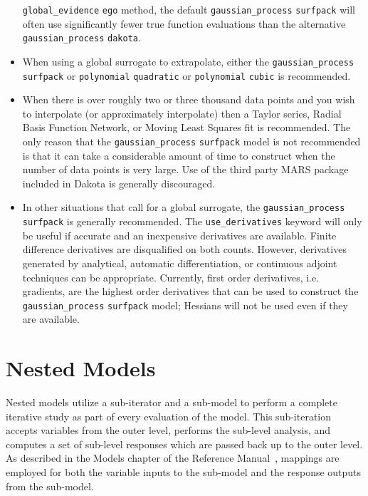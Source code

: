 \begin{itemize}
      \texttt{global\_evidence} \texttt{ego} method, the default
      \texttt{gaussian\_process} \texttt{surfpack} will often use
      significantly fewer true function evaluations than the 
      alternative \texttt{gaussian\_process} \texttt{dakota}.
\item When using a global surrogate to extrapolate, either the
      \texttt{gaussian\_process} \texttt{surfpack} or 
      \texttt{polynomial} \texttt{quadratic} or 
      \texttt{polynomial} \texttt{cubic} is recommended.
\item When there is over roughly two or three thousand data points 
      and you wish to interpolate (or approximately interpolate) then 
      a Taylor series, Radial Basis Function Network, or Moving Least
      Squares fit is recommended.  The only reason that the 
      \texttt{gaussian\_process} \texttt{surfpack} model is not 
      recommended is that it can take a considerable amount of time
      to construct when the number of data points is very large.  Use 
      of the third party MARS package included in Dakota is generally 
      discouraged.
\item In other situations that call for a global surrogate, the 
      \texttt{gaussian\_process} \texttt{surfpack} is generally 
      recommended.  The \texttt{use\_derivatives} keyword will 
      only be useful if accurate and an inexpensive derivatives 
      are available. Finite difference derivatives are disqualified 
      on both counts.  However, derivatives generated by analytical,
      automatic differentiation, or continuous adjoint techniques
      can be appropriate.  Currently, first order derivatives, i.e.
      gradients, are the highest order derivatives that can be used
      to construct the \texttt{gaussian\_process} \texttt{surfpack}
      model; Hessians will not be used even if they are available.
\end{itemize}

\section{Nested Models} \label{models:nested}

Nested models utilize a sub-iterator and a sub-model to perform a
complete iterative study as part of every evaluation of the model.
This sub-iteration accepts variables from the outer level, performs
the sub-level analysis, and computes a set of sub-level responses
which are passed back up to the outer level.  As described in the
Models chapter of the Reference Manual~\cite{RefMan}, mappings are
employed for both the variable inputs to the sub-model and the
response outputs from the sub-model.

